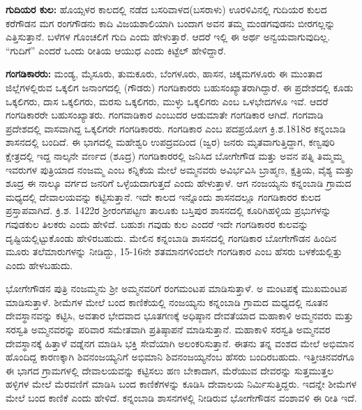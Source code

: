 \textbf{ಗುದಿಯರ ಕುಲ:} ಹೊಯ್ಸಳರ ಕಾಲದಲ್ಲಿ ನಡೆದ ಬಸರಿವಾಳದ(ಬಸರಾಳು) ಊರಳಿವಿನಲ್ಲಿ ಗುದಿಯರ ಕುಲದ ಕರೆಗೌಡನ ಮಗ ರಂಗಗೌಡನು ಕಾದಿ ವಿಜಯಶಾಲಿಯಾಗಿ ಬಂದಾಗ ಅವನ ತಮ್ಮ ಮಂಡಗವುಡನು ಬೀರಗಲ್ಲನ್ನು ಎತ್ತಿಸುತ್ತಾನೆ. ಬಳೆಗಳ ಗೊಂಚಲಿಗೆ ಗುದಿ ಎಂದು ಹೇಳುತ್ತಾರೆ. ಆದರೆ ಇಲ್ಲಿ ಈ ಅರ್ಥ ಅನ್ವಯವಾಗುವುದಿಲ್ಲ. “ಗುದಿಗೆ” ಎಂದರೆ ಒಂದು ರೀತಿಯ ಆಯುಧ ಎಂದು ಕಿಟ್ಟೆಲ್​ ಹೇಳಿದ್ದಾರೆ.

\textbf{ಗಂಗಡಿಕಾರರು:} ಮಂಡ್ಯ, ಮೈಸೂರು, ತುಮಕೂರು, ಬೆಂಗಳೂರು, ಹಾಸನ, ಚಿಕ್ಕಮಗಳೂರು ಈ ಮುಂತಾದ ಜಿಲ್ಲೆಗಳಲ್ಲಿರುವ ಒಕ್ಕಲಿಗ ಜನಾಂಗದಲ್ಲಿ (ಗೌಡರು) ಗಂಗಡಿಕಾರರು ಬಹುಸಂಖ್ಯಾತರಾಗಿದ್ದಾರೆ. ಈ ಪ್ರದೇಶದಲ್ಲಿ ಕೂಡು ಒಕ್ಕಲಿಗರು, ದಾಸ ಒಕ್ಕಲಿಗರು, ಮರಸು ಒಕ್ಕಲಿಗರು, ಮುಳ್ಳು ಒಕ್ಕಲಿಗರು ಎಂಬ ಒಳಭೇದಗಳೂ ಇವೆ. ಆದರೆ ಗಂಗಡಿಕಾರರೇ ಬಹುಸಂಖ್ಯಾತರು. ಗಂಗವಾಡಿಕಾರ ಎಂಬುದರ ಆಡುಮಾತೇ ಗಂಗಡಿಕಾರ ಆಗಿದೆ. ಗಂಗವಾಡಿ ಪ್ರದೇಶದಲ್ಲಿ ವಾಸವಾಗಿದ್ದ ಒಕ್ಕಲಿಗರೇ ಗಂಗಡಿಕಾರರು. ಗಂಗಡಿಕಾರ ಎಂಬ ಪದಪ್ರಯೋಗ ಕ್ರಿ.ಶ.1818ರ ಕನ್ನಂಬಾಡಿ ಶಾಸನದಲ್ಲಿ ಬಂದಿದೆ. ಈ ಭಾಗದಲ್ಲಿ ಮಹೇಶ್ವರಿ ಉಪದ್ರವದಿಂದ (ಜ್ವರ) ಜನರು ಮೃತವಾಗುತ್ತಿದ್ದಾಗ, ಕಣ್ವಪುರಿ ಕ್ಷೇತ್ರದಲ್ಲಿ ಇದ್ದ ನಾಲ್ಕನೇ ವರ್ಣದ (ಶೂದ್ರ) ಗಂಗಡಿಕಾರರಲ್ಲಿ ಜನಿಸಿದ ಬೋಗೇಗೌಡ ಮತ್ತು ಅವನ ಪತ್ನಿ ತಿಮ್ಮಮ್ಮ ಇವರುಗಳ ಪುತ್ರಿಯಾದ ನಂಜಮ್ಮ ಎಂಬ ಕನ್ನಿಕೆಯ ಮೇಲೆ ಅಮ್ಮನವರು ಅವಿರ್ಭವಿಸಿ ಬ್ರಾಹ್ಮಣ, ಕ್ಷತ್ರಿಯ, ವೈಶ್ಯ ಮತ್ತು ಶೂದ್ರ ಈ ನಾಲ್ಕೂ ವರ್ಗದ ಜನರಿಗೆ ಒಳ್ಳೆಯದಾಗುತ್ತದೆ ಎಂದು ಹೇಳುತ್ತಾಳೆ. ಆಗ ನಂಜಯ್ಯನು ಕನ್ನಂಬಾಡಿ ಗ್ರಾಮದ ಮಧ್ಯದಲ್ಲಿ ದೇವಾಲಯವನ್ನು ಕಟ್ಟಿಸುತ್ತಾನೆ. ಇದೇ ಕಾಲದ ಇನ್ನೊಂದು ಶಾಸನದಲ್ಲೂ ಗಂಗಡಿಕಾರರ ಕುಲದ ಪ್ರಸ್ತಾಪವಾಗಿದೆ. ಕ್ರಿ.ಶ. 1422ರ ಶ‍್ರೀರಂಗಪಟ್ಟಣ ತಾಲೂಕು ಬಸ್ತಿಪುರ ಶಾಸನದಲ್ಲಿ ಕೂರಿಗಿಹಳ್ಳಿಯ ಪ್ರಭುಗಳನ್ನು ಗವುಡಕುಲ ತಿಲಕರು ಎಂದು ಹೇಳಿದೆ. ಬಹುಶಃ ಗವುಡು ಕುಲ ಎಂದರೆ ಇದೇ ಗಂಗಡಿಕಾರರ ಕುಲವನ್ನು ದೃಷ್ಟಿಯಲ್ಲಿಟ್ಟುಕೊಂಡು ಹೇಳಿರಬಹುದು. ಮೇಲಿನ ಕನ್ನಂಬಾಡಿ ಶಾಸನದಲ್ಲಿ ಗಂಗಡಿಕಾರ ಬೋಗೇಗೌಡನ ಹಿಂದಿನ ಮೂರು ತಲೆಮಾರುಗಳನ್ನು ನೀಡಿದ್ದು, 15-16ನೇ ಶತಮಾನಗಳಿಂದಲೇ ಗಂಗಡಿಕಾರ ಎಂಬ ಹೆಸರು ಬಳಕೆಯಲ್ಲಿತ್ತು ಎಂದು ಹೇಳಬಹುದು.

ಭೋಗೇಗೌಡನ ಪುತ್ರಿ ನಂಜಮ್ಮನು ಶ‍್ರೀ ಅಮ್ಮನವರಿಗೆ ರಂಗಮಂಟಪ ಮಾಡಿಸುತ್ತಾಳೆ. ಅ ಮಂಟಪಕ್ಕೆ ಮುಖಮಂಟಪ ಮಾಡಿಸುತ್ತಾಳೆ. ಶೀಮೆಗಳ ಮೇಲೆ ಬಂದ ಕಾಣಿಕೆಯಲ್ಲಿ ನಂಜಯ್ಯನು ಕನ್ನಂಬಾಡಿ ಗ್ರಾಮದ ಮಧ್ಯದಲ್ಲಿ ನೂತನ ದೇವಸ್ಥಾನವನ್ನು ಕಟ್ಟಿಸಿ, ಅವತಾರ ಭೇದವಾದ ಭೂತಗಣಕ್ಕೆ ಅಧಿಷ್ಠಾನ ದೇವತೆಯಾದ ಮಹಾಕಾಳಿ ಅಮ್ಮನವರು ಮತ್ತು ಸರಸ್ವತಿ ಅಮ್ಮನವರನ್ನು ಪರಿವಾರ ಸಮೇತವಾಗಿ ಪ್ರತಿಷ್ಠಾಪನೆ ಮಾಡಿಸುತ್ತಾನೆ. ಮಹಾಕಾಳಿ ಸರಸ್ವತಿ ಅಮ್ಮನವರ ದೇವಸ್ಥಾನಕ್ಕೆ ಹಿತ್ತಾಳೆ ವಡ್ನೆನಗ ಮಾಡಿಸಿ ಭಕ್ತಿ ಸೇವೆಯಾಗಿ ಅಲಂಕರಿಸುತ್ತಾನೆ. ಈತನು ತನ್ನ ವಂಶದ ಮೇಲೆ ಅಭಿಮಾನ ಹೊಂದಿದ್ದ ಕಾರಣಕ್ಕಾಗಿ ಶಿವನಂಜಯ್ಯನಿಗೆ ಅಭಿಮಾನಿ ಶಿವನಂಜಯ್ಯನೆಂಬ ಹೆಸರು ಬಂದಿರಬಹುದು. ಇತ್ತೀಚಿನವರೆಗೂ ಈ ಭಾಗದ ಗ್ರಾಮಗಳಲ್ಲಿ ದೇವಾಲಯವನ್ನು ಕಟ್ಟಿಸಲು ಹಣ ಬೇಕಾದಾಗ, ಮೆರೆಯುವ ದೇವರನ್ನು ಸುತ್ತಮುತ್ತಲ ಹಳ್ಳಿಗಳ ಮೇಲೆ ಮೆರವಣಿಗೆ ಮಾಡಿಸಿ ಬಂದ ಕಾಣಿಕೆಗಳನ್ನು ಕೂಡಿಸಿ ದೇವಾಲಯ ನಿರ್ಮಿಸುತ್ತಿದ್ದರು. ಇದನ್ನೇ ಶೀಮೆಗಳ ಮೇಲೆ ಬಂದ ಕಾಣಿಕೆ ಎಂದು ಹೇಳಿದೆ. ಕನ್ನಂಬಾಡಿ ಶಾಸನಗಳಲ್ಲಿ ನೀಡಿರುವ ಭೋಗೇಗೌಡನ ವಂಶಾವಳಿ ಈ ರೀತಿ ಇದೆ.

